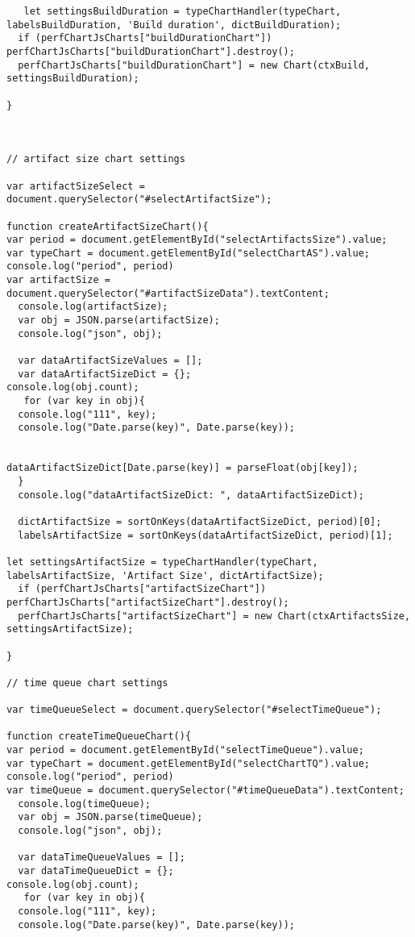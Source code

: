 \begin{lstlisting}
   let settingsBuildDuration = typeChartHandler(typeChart, labelsBuildDuration, 'Build duration', dictBuildDuration);
  if (perfChartJsCharts["buildDurationChart"]) perfChartJsCharts["buildDurationChart"].destroy();
  perfChartJsCharts["buildDurationChart"] = new Chart(ctxBuild, settingsBuildDuration);

}



// artifact size chart settings

var artifactSizeSelect = document.querySelector("#selectArtifactSize");

function createArtifactSizeChart(){
var period = document.getElementById("selectArtifactsSize").value;
var typeChart = document.getElementById("selectChartAS").value;
console.log("period", period)
var artifactSize = document.querySelector("#artifactSizeData").textContent;
  console.log(artifactSize);
  var obj = JSON.parse(artifactSize);
  console.log("json", obj);

  var dataArtifactSizeValues = [];
  var dataArtifactSizeDict = {};
console.log(obj.count);
   for (var key in obj){
  console.log("111", key);
  console.log("Date.parse(key)", Date.parse(key));


dataArtifactSizeDict[Date.parse(key)] = parseFloat(obj[key]);
  }
  console.log("dataArtifactSizeDict: ", dataArtifactSizeDict);

  dictArtifactSize = sortOnKeys(dataArtifactSizeDict, period)[0];
  labelsArtifactSize = sortOnKeys(dataArtifactSizeDict, period)[1];

let settingsArtifactSize = typeChartHandler(typeChart, labelsArtifactSize, 'Artifact Size', dictArtifactSize);
  if (perfChartJsCharts["artifactSizeChart"]) perfChartJsCharts["artifactSizeChart"].destroy();
  perfChartJsCharts["artifactSizeChart"] = new Chart(ctxArtifactsSize, settingsArtifactSize);

}

// time queue chart settings

var timeQueueSelect = document.querySelector("#selectTimeQueue");

function createTimeQueueChart(){
var period = document.getElementById("selectTimeQueue").value;
var typeChart = document.getElementById("selectChartTQ").value;
console.log("period", period)
var timeQueue = document.querySelector("#timeQueueData").textContent;
  console.log(timeQueue);
  var obj = JSON.parse(timeQueue);
  console.log("json", obj);

  var dataTimeQueueValues = [];
  var dataTimeQueueDict = {};
console.log(obj.count);
   for (var key in obj){
  console.log("111", key);
  console.log("Date.parse(key)", Date.parse(key));



\end{lstlisting}
